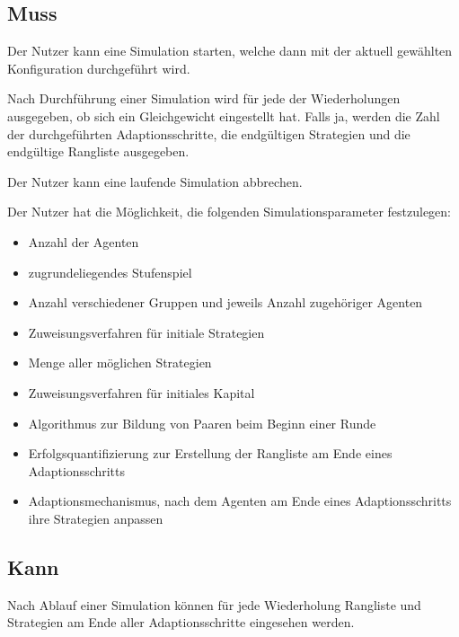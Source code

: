 \documentclass[parskip=full,11pt,twoside]{scrartcl}
\def\adapt{Adaptionsschritt}
\def\adapts{Adaptionsschritte}
\begin{document}
\subsection{Muss}


Der Nutzer kann eine Simulation starten, welche dann mit der aktuell gewählten Konfiguration durchgeführt wird.


Nach Durchführung einer Simulation wird für jede der Wiederholungen ausgegeben, ob sich ein Gleichgewicht eingestellt hat. Falls ja, werden die Zahl der durchgeführten \adapts, die endgültigen Strategien und die endgültige Rangliste ausgegeben.


Der Nutzer kann eine laufende Simulation abbrechen.


Der Nutzer hat die Möglichkeit, die folgenden Simulationsparameter festzulegen:
\begin{itemize} \itemsep -10pt
\item Anzahl der Agenten
\item zugrundeliegendes Stufenspiel
\item Anzahl verschiedener Gruppen und jeweils Anzahl zugehöriger Agenten
\item Zuweisungsverfahren für initiale Strategien
\item Menge aller möglichen Strategien
\item Zuweisungsverfahren für initiales Kapital
\item Algorithmus zur Bildung von Paaren beim Beginn einer Runde
\item Erfolgsquantifizierung zur Erstellung der Rangliste am Ende eines \adapt s
\item Adaptionsmechanismus, nach dem Agenten am Ende eines \adapt s ihre Strategien anpassen
\end{itemize}

\subsection{Kann}

Nach Ablauf einer Simulation können für jede Wiederholung Rangliste und Strategien am Ende aller Adaptionsschritte eingesehen werden.
\end{document}
